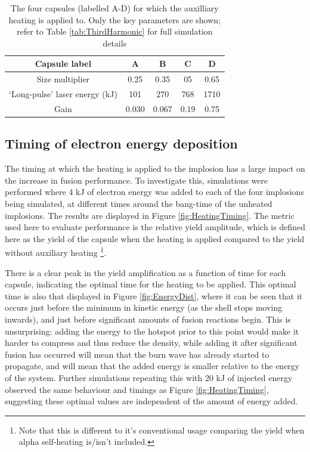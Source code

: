 \begin{table}
\centering
\begin{tabular}{|c|c|c|c|c|}
\hline
Capsule label &  A & B & C & D \\ 
\hline
Size multiplier & 0.25 & 0.35 & 05 & 0.65 \\
`Long-pulse' laser energy (kJ) & 101  & 270 & 768 & 1710 \\ 
Gain & 0.030 & 0.067 & 0.19 & 0.75\\ 
\hline
  \end{tabular}
  \caption{The four capsules (labelled A-D) for which the auxilliary heating is applied to. Only the key parameters are shown; refer to Table \ref{tab:ThirdHarmonic} for full simulation details}
  \label{tab:Heating capsules}
\end{table}

\subsection{Timing of electron energy deposition}

The timing at which the heating is applied to the implosion has a large impact on the increase in fusion performance. To investigate this, simulations were performed where 4 kJ of electron energy was added to each of the four implosions being simulated, at different times around the bang-time of the unheated implosions. The results are displayed in Figure \ref{fig:HeatingTiming}. The metric used here to evaluate performance is the relative yield amplitude, which is defined here as the yield of the capsule when the heating is applied compared to the yield without auxiliary heating \footnote{Note that this is different to it's conventional usage comparing the yield when alpha self-heating is/isn't included.}.

There is a clear peak in the yield amplification as a function of time for each capsule, indicating the optimal time for the heating to be applied. This optimal time is also that displayed in Figure \ref{fig:EnergyDist}, where it can be seen that it occurs just before the minimum in kinetic energy (as the shell stops moving inwards), and just before significant amounts of fusion reactions begin. This is unsurprising: adding the energy to the hotspot prior to this point would make it harder to compress and thus reduce the density, while adding it after significant fusion has occurred will mean that the burn wave has already started to propagate, and will mean that the added energy is smaller relative to the energy of the system. Further simulations repeating this with 20 kJ of injected energy observed the same behaviour and timings as Figure \ref{fig:HeatingTiming}, suggesting these optimal values are independent of the amount of energy added.

